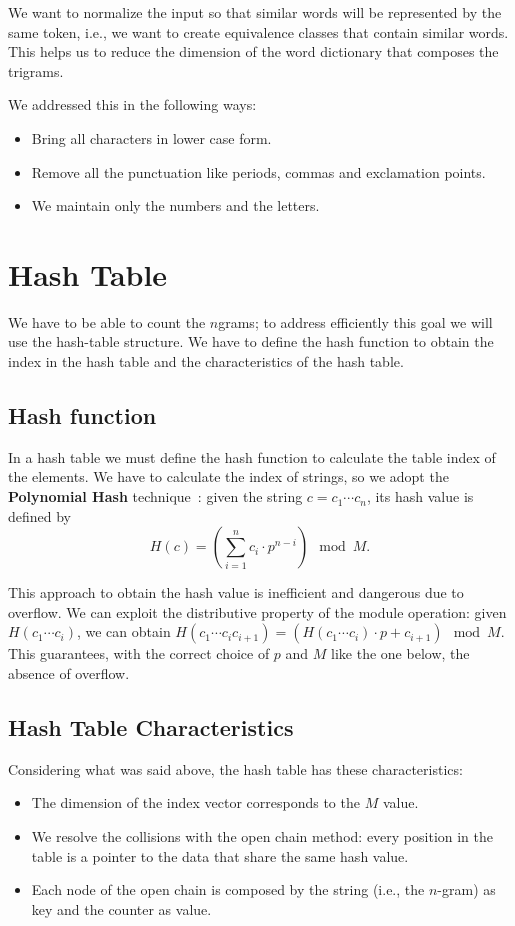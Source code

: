 \myskip

We want to normalize the input so that similar words will be represented by the same token, i.e., we want to create equivalence classes that contain similar words. This helps us to reduce the dimension of the word dictionary that composes the trigrams.

We addressed this in the following ways:
\begin{itemize}
    \item Bring all characters in lower case form.
    \item Remove all the punctuation like periods, commas and exclamation points.
    \item We maintain only the numbers and the letters.
\end{itemize}

\section{Hash Table}
\label{sec:hash_table}
We have to be able to count the $n$grams; to address efficiently this goal we will use the hash-table structure. We have to define the hash function to obtain the index in the hash table and the characteristics of the hash table.

\subsection{Hash function}
\label{sec:hash_function}
In a hash table we must define the hash function to calculate the table index of the elements. We have to calculate the index of strings, so we adopt the \textbf{Polynomial Hash} technique~\cite{polinomial_strings_hashing}: given the string $c=c_1\cdots c_n$, its hash value is defined by $$\displaystyle H(c)=\left(\sum_{i=1}^n c_i\cdot p^{n-i}\right) \mod M.$$

This approach to obtain the hash value is inefficient and dangerous due to overflow. We can exploit the distributive property of the module operation: given $H(c_1\cdots c_i)$, we can obtain $H(c_1\cdots c_ic_{i+1})=(H(c_1\cdots c_i)\cdot p+c_{i+1}) \mod M$. This guarantees, with the correct choice of $p$ and $M$ like the one below, the absence of overflow.

\subsection{Hash Table Characteristics}
Considering what was said above, the hash table has these characteristics:
\begin{itemize}
    \item The dimension of the index vector corresponds to the $M$ value.
    \item We resolve the collisions with the open chain method: every position in the table is a pointer to the data that share the same hash value.
    \item Each node of the open chain is composed by the string (i.e., the $n$-gram) as key and the counter as value.
\end{itemize}

